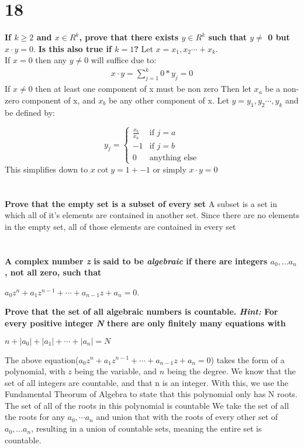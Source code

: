 \documentclass{article}
\begin{document}
\section* {18}
\noindent \textbf{If $k \ge 2$ and $x \in R^k$, prove that there exists $y \in R^k$ such that $y \neq$ 0 but $x \cdot y = 0.$}\newline
\textbf{Is this also true if $k = 1$?}\newline
Let $x = {x_1, x_2 \cdots + x_k}$.\\
If $x = 0$ then any $y \neq 0$ will suffice due to:
\begin{align*}
    x \cdot y = \sum_{j=1}^{k} 0*y_j = 0
\end{align*}
If $x \neq 0$ then at least one component of x must be non zero
Then let $x_a$ be a non-zero component of x, and $x_b$ be any other component of x. Let $y = {y_1, y_2 \cdots, y_k }$ and be defined by:

\[
    y_j = 
    \begin{cases}
        \frac{x_b}{x_a}& \text{if } j = a\\
        -1& \text{if } j = b\\
        0& \text{anything else}
    \end{cases}  
\]
This simplifies down to $x \cot y = 1 + -1$ or simply $x \cdot y = 0$ 
\section{}
\noindent \textbf{Prove that the empty set is a subset of every set}
A subset is a set in which all of it's elements are contained in another set. Since there are no elements in the empty set, all of those elements are contained in every set
\section{}
\noindent \textbf{A complex number \emph{z} is said to be \emph{algebraic} if there are integers $a_0, ... a_n$, not all zero, such that } \begin{center} $a_0z^n + a_1z^{n-1} + \cdots + a_{n-1}z + a_n = 0$.\end{center}
\textbf{Prove that the set of all algebraic numbers is countable. \emph{Hint:} For every positive integer \emph{N} there are only finitely many equations with} \begin{center}
    $n + |a_0| + |a_1| + \cdots + |a_n| = N$
\end{center} 
The above equation($a_0z^n + a_1z^{n-1} + \cdots + a_{n-1}z + a_n = 0$) takes the form of a polynomial, with $z$ being the variable, and $n$ being the degree. We know that the set of all integers are countable, and that n is an integer. With this,
we use the Fundamental Theorum of Algebra to state that this polynomial only has N roots. The set of all of the roots in this polynomial is countable We take the set of all the roots for any $a_0, \cdots a_n$ and union that with the roots of every other set of $a_0, ... a_n$, resulting in a union of countable sets, meaning 
the entire set is countable.
\begin{align*}
\end{align*}
\end{document}
